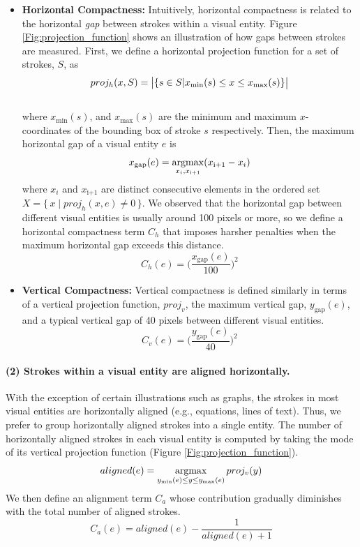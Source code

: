 \begin{itemize}
\item \textbf{Horizontal Compactness:} Intuitively, horizontal compactness is related to the horizontal
\emph{gap} between strokes within a visual entity. Figure \ref{Fig:projection_function}
shows an illustration of how gaps between strokes are measured. First, we define a horizontal projection function for a set of strokes, $S$, as 
\begin{equation}
proj_h(x, S) = \big{|}\{s\in S \small{|} x_\text{min}(s)\le x \le x_\text{max}(s)\}\big{|}
\label{Eq:projh}
\end{equation}\\  
where $x_\text{min}(s)$, and $x_\text{max}(s)$ are the minimum and maximum $x$-coordinates of the bounding box of stroke $s$ respectively. Then, the maximum horizontal gap of a visual entity $e$ is
 \begin{equation}
 x_\text{gap}(e) = \operatorname*{argmax}_{x_i, x_\text{i+1}} (x_\text{i+1}
 - x_i)
 \end{equation}
where $x_i$ and $x_\text{i+1}$ are distinct consecutive elements in the ordered set $X =\{\,x \mid proj_{h}(x,e)\ne 0\,\} $. We observed that the horizontal gap between different visual entities
is usually around 100 pixels or more, so we define a horizontal compactness
term $C_{h}$ that imposes harsher penalties when the maximum
horizontal gap exceeds this distance.
\begin{equation}
C_{h}(e) = \big(\frac{x_\text{gap}(e)}{100}\big)^2
\end{equation}

\item \textbf{Vertical Compactness:} Vertical compactness is defined similarly in terms of a vertical projection
function, $proj_{v}$, the maximum vertical gap,
$y_\text{gap}(e)$, and a typical vertical gap of 40 pixels between
different visual entities.
\begin{equation}
C_v(e) = \big(\frac{y_\text{gap}(e)}{40}\big)^2
\end{equation}
\end{itemize}

\paragraph{(2) Strokes within a visual entity are aligned horizontally.} With the exception
of certain illustrations such as graphs, the strokes in most visual
entities are horizontally aligned (e.g., equations, lines of
text). Thus, we prefer to group horizontally aligned strokes into a single
entity. The number of horizontally aligned strokes in each visual entity is computed by taking the mode of its vertical projection function (Figure \ref{Fig:projection_function}).
\begin{equation}
aligned(e) = \operatorname*{argmax}_{y_\text{min}(e) \le y \le y_\text{max}(e)} proj_v(y)
\end{equation}
We then define an alignment term $C_a$ whose contribution gradually
diminishes with the total number of aligned strokes.
\begin{equation}
C_a(e) = aligned(e)-\frac{1}{aligned(e)+1}
\label{Eq:n_align}
\end{equation}

